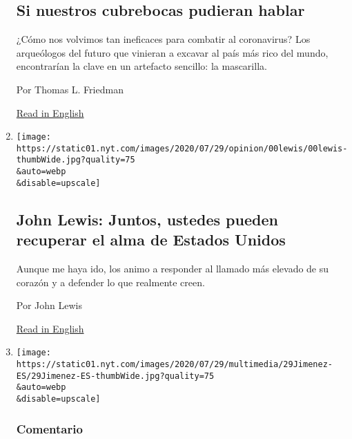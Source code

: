 \begin{enumerate}
  \hypertarget{si-nuestros-cubrebocas-pudieran-hablar}{%
  \subsection{Si nuestros cubrebocas pudieran
  hablar}\label{si-nuestros-cubrebocas-pudieran-hablar}}

  ¿Cómo nos volvimos tan ineficaces para combatir al coronavirus? Los
  arqueólogos del futuro que vinieran a excavar al país más rico del
  mundo, encontrarían la clave en un artefacto sencillo: la mascarilla.

  Por Thomas L. Friedman

  \href{https://www.nytimes.com/2020/07/28/opinion/coronavirus-masks.html}{Read
  in English}
\item
  \href{/es/2020/07/30/espanol/opinion/john-lewis-derechos-civiles.html}{}

  \texttt{[image: https://static01.nyt.com/images/2020/07/29/opinion/00lewis/00lewis-thumbWide.jpg?quality=75\\\&auto=webp\\\&disable=upscale]}

  \hypertarget{john-lewis-juntos-ustedes-pueden-recuperar-el-alma-de-estados-unidos}{%
  \subsection{John Lewis: Juntos, ustedes pueden recuperar el alma de
  Estados
  Unidos}\label{john-lewis-juntos-ustedes-pueden-recuperar-el-alma-de-estados-unidos}}

  Aunque me haya ido, los animo a responder al llamado más elevado de su
  corazón y a defender lo que realmente creen.

  Por John Lewis

  \href{https://www.nytimes.com/2020/07/30/opinion/john-lewis-civil-rights-america.html}{Read
  in English}
\item
  \href{/es/2020/07/29/espanol/opinion/espana-felipe-gonzalez-jose-maria-aznar.html}{}

  \texttt{[image: https://static01.nyt.com/images/2020/07/29/multimedia/29Jimenez-ES/29Jimenez-ES-thumbWide.jpg?quality=75\\\&auto=webp\\\&disable=upscale]}

  \hypertarget{comentario-8}{%
  \subsubsection{Comentario}\label{comentario-8}}

  \hypertarget{manual-de-comportamiento-para-expresidentes-insoportables}{%
}
\end{enumerate}
